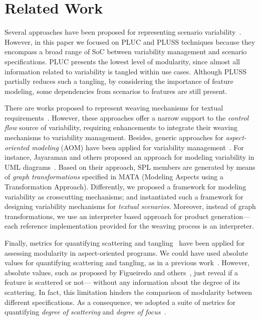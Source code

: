 \documentclass{sig-alt-full}
\begin{document}
\section{Related Work}
\label{sec:related}

Several approaches have been proposed for representing
scenario variability~\cite{Jacobson:1997aa,Eriksson:2005aa,Bertolino:2003aa}. However, in this paper
we focused on PLUC and
PLUSS techniques because they encompass a broad range
of SoC between variability management and scenario specifications.
PLUC presents the lowest level of modularity, since
almost all information related to variability is tangled within
use cases. Although PLUSS partially reduces such a tangling,
by considering the importance of feature modeling, some
dependencies from scenarios to features are still present.

There are works proposed to
represent weaving mechanisms for textual
requirements~\cite{Chitchyan:2007aa,Sillito:2004aa}. However, these approaches offer a narrow support to the \emph{control flow} source of variability, requiring enhancements to integrate their weaving mechanisms to variability management. Besides, generic 
approaches for \emph{aspect-oriented modeling} (AOM) have been applied for 
variability management~\cite{Jayaraman:2007aa,Morin:2008aa,Groher:2008aa}. For instance, Jayaraman and others proposed an approach for modeling variability in UML diagrams~\cite{Jayaraman:2007aa}. Based on their approach, SPL members are generated by means of \emph{graph transformations} specified in MATA (Modeling Aspects using a Transformation Approach). Differently, we proposed a framework for modeling variability as crosscutting mechanisms; and instantiated such a framework for designing variability mechanisms for \emph{textual scenarios}. Moreover, instead of graph transformations, we use an interpreter based approach for product generation--- each reference implementation provided for the weaving process is an interpreter.

Finally, metrics for quantifying scattering and tangling~\cite{Eaddy:2007aa,Figueiredo:2008aa} have been applied for assessing modularity in aspect-oriented
programs. We could have used absolute values for quantifying scattering and tangling, as in a previous work~\cite{Bonifacio:2008aa}. However, absolute values, such as proposed by Figueiredo and others~\cite{Figueiredo:2008aa}, just reveal if a feature is scattered or not--- without any information about the degree of its scattering. In fact, this limitation hinders the comparison of modularity between different specifications.
As a consequence, we adopted a suite of metrics for quantifying
\emph{degree of scattering} and \emph{degree of focus}~\cite{Eaddy:2007aa}.
\end{document}
